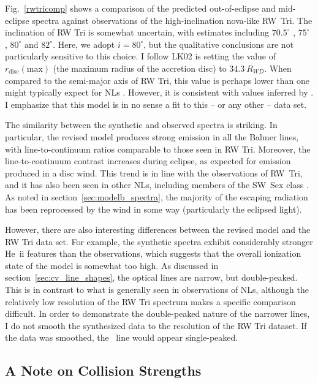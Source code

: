 Fig.~\ref{rwtricomp} shows a comparison of the predicted
out-of-eclipse and mid-eclipse spectra against observations of the
high-inclination nova-like RW~Tri. The inclination of RW Tri is
somewhat uncertain, with estimates including $70.5^\circ$
\citep{smak1995}, $75^\circ$ \citep{groot2004}, $80^\circ$
\citep{longmore1981} and $82^\circ$\citep{frankking1981}. Here, we
adopt $i = 80^\circ$, but the qualitative conclusions are not
particularly sensitive to this choice. 
I follow LK02 is setting the value of $r_{\mathrm{disc}}(\mathrm{max})$ (the maximum radius of the accretion disc)
to $34.3~R_{WD}$. When compared to the semi-major axis of RW Tri,
this value is perhaps lower than one might 
typically expect for NLs \citep{harropallinwarner1996}. 
However, it is consistent
with values inferred by \cite{rutten1992}.
I emphasize that this model is in no sense a fit to this -- or any other -- data set.


The similarity between the synthetic and observed spectra is
striking. In particular, the revised model produces strong emission in
all the Balmer lines, with line-to-continuum ratios comparable to
those seen in RW Tri. Moreover, the line-to-continuum contrast
increases during eclipse, as expected for emission produced in a disc
wind. This trend is in line with the observations of RW~Tri, and it
has also been seen in other NLs, including members of the SW~Sex class
\citep{neustroev2011}. As noted in section~\ref{sec:modelb_spectra}, the majority
of the escaping radiation has been reprocessed by the wind in some way
(particularly the eclipsed light).

However, there are also interesting differences between the revised
model and the RW Tri data set. For example, the synthetic spectra exhibit
considerably stronger He~{\sc ii} features than the observations,
which suggests that the overall ionization state of the model is
somewhat too high. As discussed in section~\ref{sec:cv_line_shapes}, 
the optical lines are narrow, but double-peaked. 
This is in contrast to what is generally seen in observations
of NLs, although the relatively low resolution of the RW Tri
spectrum makes a specific comparison difficult. In order to demonstrate
the double-peaked nature of the narrower lines, I do not 
smooth the synthesized data to the resolution of the RW Tri dataset.
If the data was smoothed, the \ha\ line would appear single-peaked.

\subsection{A Note on Collision Strengths}
\label{sec:coll_bl}

